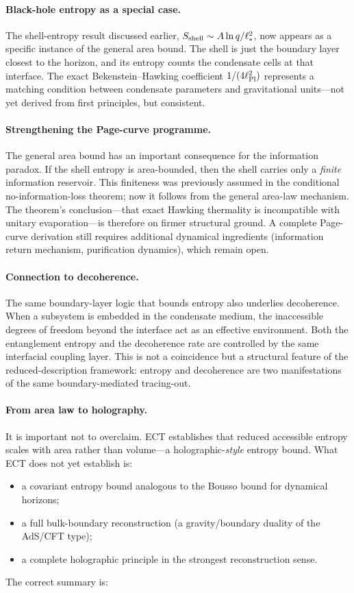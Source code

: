 \documentclass[11pt,a4paper]{article}
\begin{document}
\paragraph{Black-hole entropy as a special case.}
The shell-entropy result discussed earlier,
$S_{\rm shell}\sim A\ln q/\ell_*^2$,
now appears as a specific instance of the general area bound.
The shell is just the boundary layer closest to the horizon, and
its entropy counts the condensate cells at that interface.
The exact Bekenstein--Hawking coefficient $1/(4\ell_{\rm Pl}^2)$
represents a matching condition between condensate parameters and
gravitational units---not yet derived from first principles, but
consistent.

\paragraph{Strengthening the Page-curve programme.}
The general area bound has an important consequence for the
information paradox.
If the shell entropy is area-bounded, then the shell carries
only a \emph{finite} information reservoir.
This finiteness was previously assumed in the conditional
no-information-loss theorem; now it follows from the general
area-law mechanism.
The theorem's conclusion---that exact Hawking thermality is
incompatible with unitary evaporation---is therefore on firmer
structural ground.
A complete Page-curve derivation still requires additional
dynamical ingredients (information return mechanism, purification
dynamics), which remain open.

\paragraph{Connection to decoherence.}
The same boundary-layer logic that bounds entropy also underlies
decoherence.
When a subsystem is embedded in the condensate medium, the
inaccessible degrees of freedom beyond the interface act as an
effective environment.
Both the entanglement entropy and the decoherence rate are
controlled by the same interfacial coupling layer.
This is not a coincidence but a structural feature of the
reduced-description framework: entropy and decoherence are two
manifestations of the same boundary-mediated tracing-out.

\paragraph{From area law to holography.}
It is important not to overclaim.
ECT establishes that reduced accessible entropy scales with area
rather than volume---a holographic-\emph{style} entropy bound.
What ECT does not yet establish is:
\begin{itemize}[nosep]
  \item a covariant entropy bound analogous to the Bousso bound
    for dynamical horizons;
  \item a full bulk-boundary reconstruction (a gravity/boundary
    duality of the AdS/CFT type);
  \item a complete holographic principle in the strongest
    reconstruction sense.
\end{itemize}
The correct summary is:
\end{document}
